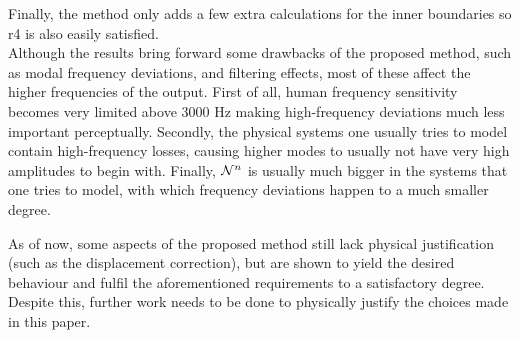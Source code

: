 Finally, the method only adds a few extra calculations for the inner boundaries so r4 is also easily satisfied. 
\\

Although the results bring forward some drawbacks of the proposed method, such as modal frequency deviations, and filtering effects, most of these affect the higher frequencies of the output. First of all, human frequency sensitivity becomes very limited above 3000 Hz \cite{Zwicker1990} making high-frequency deviations much less important perceptually. Secondly, the physical systems one usually tries to model contain high-frequency losses, causing higher modes to usually not have very high amplitudes to begin with. Finally, $\mathcal{N}^n$ is usually much bigger in the systems that one tries to model, with which frequency deviations happen to a much smaller degree. 

As of now, some aspects of the proposed method still lack physical justification (such as the displacement correction), but are shown to yield the desired behaviour and fulfil the aforementioned requirements to a satisfactory degree. Despite this, further work needs to be done to physically justify the choices made in this paper.


